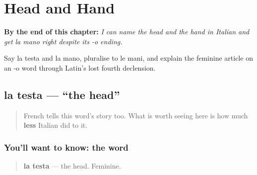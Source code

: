 
\chapter{Head and Hand}
\label{ch:it-head-and-hand}

\begin{chapteropening}
\textbf{By the end of this chapter:} \emph{I can name the head and the hand in Italian and get la mano right despite its -o ending.}

Say la testa and la mano, pluralise to le mani, and explain the feminine article on an -o word through Latin's lost fourth declension.
\end{chapteropening}

\section[la testa]{la testa — \textquotedblleft{}the head\textquotedblright{}}

\label{lesson:IT-C17-testa}



\begin{quote}
French tells this word's story too. What is worth seeing here is how much \textbf{less} Italian did to it.
\end{quote}

\subsection*{You'll want to know: the word}
\begin{quote}
\textbf{la testa} — the head. Feminine.
\end{quote}

